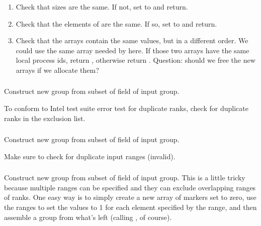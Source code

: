 \documentclass{article}
\begin{document}
\subsubsection{}

\subsubsection{}
\begin{enumerate}
\item Check that sizes are the same.  If not, set  to
   and return.
\item Check that the elements of  are the same.  If so,
set  to  and return.
\item Check that the  arrays contain the same values, but
  in a different order.  We could use the same array needed by
   here.  If those two arrays have the same
  local process ids, return , otherwise return
  .  Question: should we free the new arrays if we
  allocate them?
\end{enumerate}

\subsubsection{}
\begin{adi3}
  Construct new group from subset of  field of
  input group.

  To conform to Intel test suite error test for duplicate ranks, check for 
  duplicate ranks in the exclusion list.
\end{adi3}

\subsubsection{}
\begin{adi3}
  Construct new group from subset of  field of
  input group.

  Make sure to check for duplicate input ranges (invalid).
\end{adi3}

\subsubsection{}
\begin{adi3}
  Construct new group from subset of  field of
  input group.  This is a little tricky because multiple ranges can be
  specified and they can exclude overlapping ranges of ranks.  One easy way is
  to simply create a new array of markers set to zero, use the ranges to set
  the values to 1 for each element specified by the range, and then assemble
  a group from what's left (calling , of course).
\end{adi3}
\end{document}
